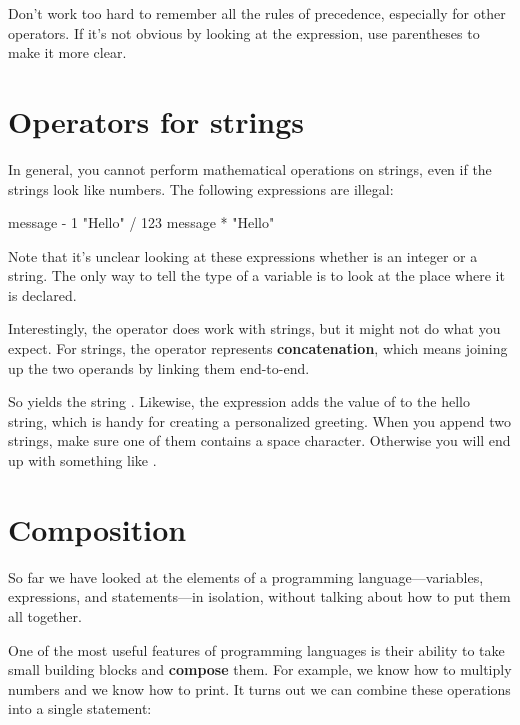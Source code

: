 Don't work too hard to remember all the rules of precedence, especially for other operators.
If it's not obvious by looking at the expression, use parentheses to make it more clear.


\section{Operators for strings}


In general, you cannot perform mathematical operations on strings, even if the strings look like numbers.
The following expressions are illegal:

\begin{code}
    message - 1     "Hello" / 123     message * "Hello"
\end{code}

Note that it's unclear looking at these expressions whether  is an integer or a string.
The only way to tell the type of a variable is to look at the place where it is declared.


Interestingly, the \java{+} operator does work with strings, but it might not do what you expect.
For strings, the \java{+} operator represents {\bf concatenation}, which means joining up the two operands by linking them end-to-end.

So  yields the string .
Likewise, the expression  adds the value of  to the hello string, which is handy for creating a personalized greeting.
When you append two strings, make sure one of them contains a space character.
Otherwise you will end up with something like .


\section{Composition}


So far we have looked at the elements of a programming language---variables, expressions, and statements---in isolation, without talking about how to put them all together.

One of the most useful features of programming languages is their ability to take small building blocks and {\bf compose} them.
For example, we know how to multiply numbers and we know how to print.
It turns out we can combine these operations into a single statement:

